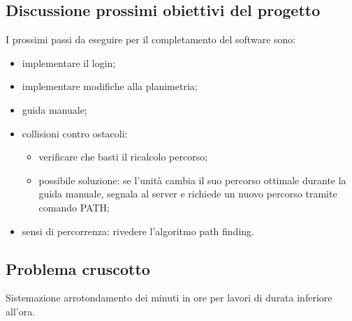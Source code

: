 \subsection{Discussione prossimi obiettivi del progetto}
I prossimi passi da eseguire per il completamento del software sono:
	\begin{itemize}
		\item implementare il login;
		\item implementare modifiche alla planimetria;
		\item guida manuale;
		\item collisioni contro ostacoli:
		\begin{itemize}
			\item verificare che basti il ricalcolo percorso;
			\item possibile soluzione: se l'unità cambia il suo percorso ottimale durante la guida manuale, segnala al server e richiede un nuovo percorso tramite comando PATH;
		\end{itemize}
		\item sensi di percorrenza: rivedere l'algoritmo path finding.
	\end{itemize}
\subsection{Problema cruscotto}
Sistemazione arrotondamento dei minuti in ore per lavori di durata inferiore all'ora.